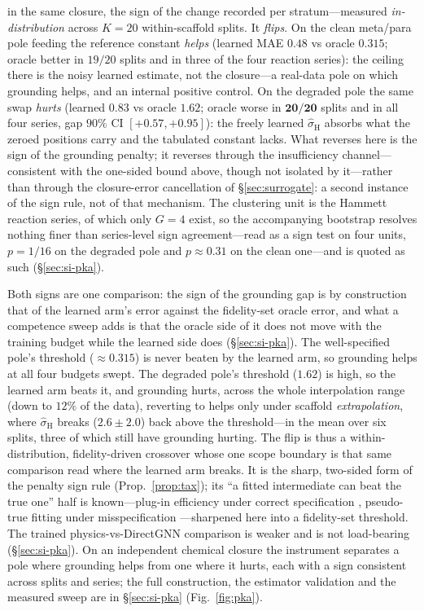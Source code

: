 in the same closure, the sign of the change recorded per stratum---measured \emph{in-distribution} across
$K{=}20$ within-scaffold splits. It \emph{flips}. On the clean meta/para
pole feeding the reference constant \emph{helps} (learned MAE $0.48$ vs oracle $0.315$; oracle better
in $19/20$ splits and in three of the four reaction series): the ceiling there is the noisy learned estimate, not the
closure---a real-data pole on which grounding helps, and an internal positive control. On the degraded pole the
same swap \emph{hurts} (learned $0.83$ vs oracle $1.62$; oracle worse in $\mathbf{20/20}$ splits and in
all four series, gap $90\%$ CI $[{+}0.57,{+}0.95]$): the freely learned $\hat\sigma_{\mathrm H}$ absorbs what
the zeroed positions carry and the tabulated constant lacks. What reverses here is the sign of the grounding penalty; it
reverses through the insufficiency channel---consistent with the one-sided bound above, though not
isolated by it---rather than through the closure-error cancellation of \S\ref{sec:surrogate}: a second
instance of the sign rule, not of that mechanism.
The clustering unit is the Hammett reaction series, of which only $G{=}4$ exist,
so the accompanying bootstrap resolves nothing finer than series-level sign agreement---read as a
sign test on four units, $p{=}1/16$ on the degraded pole and $p{\approx}0.31$ on the clean one---and is
quoted as such (\S\ref{sec:si-pka}).

Both signs are one comparison: the sign of the grounding gap is by construction that of the learned
arm's error against the fidelity-set oracle error, and what a competence sweep adds is that the
oracle side of it does not move with the training budget while the learned side does
(\S\ref{sec:si-pka}). The well-specified pole's threshold (${\approx}0.315$) is never beaten by
the learned arm, so grounding helps at all four budgets swept. The degraded pole's threshold ($1.62$)
is high, so the learned arm beats it, and grounding hurts, across the whole interpolation range
(down to $12\%$ of the data), reverting to helps only under scaffold \emph{extrapolation}, where
$\hat\sigma_{\mathrm H}$ breaks ($2.6{\pm}2.0$) back above the threshold---in the mean over six
splits, three of which still have grounding hurting. The flip is thus a within-distribution, fidelity-driven crossover whose one
scope boundary is that same comparison read where the learned arm breaks. It is the sharp, two-sided form of the penalty sign rule
(Prop.~\ref{prop:tax}); its ``a fitted intermediate can beat the true one'' half is known---plug-in
efficiency under correct specification \cite{hirano2003}, pseudo-true fitting under misspecification
\cite{white1982}---sharpened here into a fidelity-set
threshold. The trained physics-vs-DirectGNN comparison is weaker and is not load-bearing
(\S\ref{sec:si-pka}). On an independent chemical closure the instrument separates a pole where
grounding helps from one where it hurts, each with a sign consistent across splits and series; the full construction,
the estimator validation and the measured sweep are in \S\ref{sec:si-pka} (Fig.~\ref{fig:pka}).
